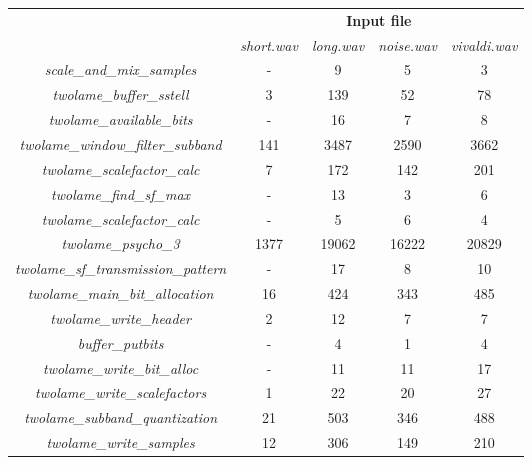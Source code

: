 \begin{table}[H]
    \centering
    \begin{tabular}{|c|c|c|c|c|}
    \cline{2-5}
    \multicolumn{1}{c|}{}  & \multicolumn{4}{c|}{\textbf{Input file}} \\
    \cline{2-5}
    \multicolumn{1}{c|}{} & \textit{short.wav} & \textit{long.wav} & \textit{noise.wav} & \textit{vivaldi.wav} \\
    \hline
    \multicolumn{1}{|c|}{\textit{scale\_and\_mix\_samples}}  & - & 9 & 5 & 3 \\ 
   \hline
    \multicolumn{1}{|c|}{\textit{twolame\_buffer\_sstell}} & 3 & 139 & 52 & 78 \\ 
    \hline
     \multicolumn{1}{|c|}{\textit{twolame\_available\_bits}} & - & 16 & 7 & 8  \\ 
    \hline
     \multicolumn{1}{|c|}{\textit{twolame\_window\_filter\_subband}} & 141  & 3487 & 2590 & 3662  \\ 
    \hline
     \multicolumn{1}{|c|}{\textit{twolame\_scalefactor\_calc}} & 7 & 172 & 142 &  201  \\ 
    \hline
     \multicolumn{1}{|c|}{\textit{twolame\_find\_sf\_max}} & -  & 13 & 3 & 6   \\ 
    \hline
     \multicolumn{1}{|c|}{\textit{twolame\_scalefactor\_calc}} & -  & 5 & 6 & 4  \\ 
    \hline
      \multicolumn{1}{|c|}{\textit{twolame\_psycho\_3}} & 1377  & 19062 & 16222 &  20829 \\ 
     \hline
     \multicolumn{1}{|c|}{\textit{twolame\_sf\_transmission\_pattern}} & - & 17 & 8 &  10 \\ 
    \hline
     \multicolumn{1}{|c|}{\textit{twolame\_main\_bit\_allocation}} & 16  & 424 & 343 & 485  \\ 
    \hline
     \multicolumn{1}{|c|}{\textit{twolame\_write\_header}} & 2 & 12 & 7 &  7 \\
    \hline
     \multicolumn{1}{|c|}{\textit{buffer\_putbits}} & - & 4 & 1 & 4  \\
    \hline
     \multicolumn{1}{|c|}{\textit{twolame\_write\_bit\_alloc}} & - & 11 & 11 &  17 \\
    \hline
     \multicolumn{1}{|c|}{\textit{twolame\_write\_scalefactors}} & 1 & 22 & 20 & 27 \\
    \hline
     \multicolumn{1}{|c|}{\textit{twolame\_subband\_quantization}} & 21 & 503 & 346 & 488 \\
    \hline
     \multicolumn{1}{|c|}{\textit{twolame\_write\_samples}} & 12 & 306 & 149 & 210 \\

\end{tabular}
\end{table}
